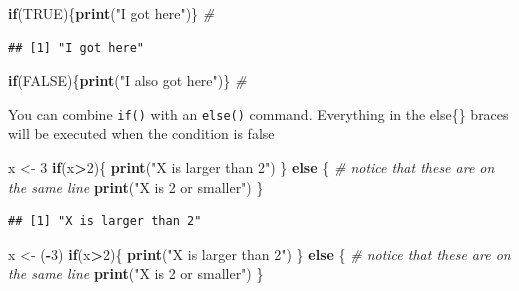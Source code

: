 \documentclass[]{article}
\newenvironment{Shaded}{\begin{snugshade}}{\end{snugshade}}
\newcommand{\KeywordTok}[1]{\textcolor[rgb]{0.13,0.29,0.53}{\textbf{#1}}}
\newcommand{\DecValTok}[1]{\textcolor[rgb]{0.00,0.00,0.81}{#1}}
\newcommand{\StringTok}[1]{\textcolor[rgb]{0.31,0.60,0.02}{#1}}
\newcommand{\CommentTok}[1]{\textcolor[rgb]{0.56,0.35,0.01}{\textit{#1}}}
\newcommand{\OtherTok}[1]{\textcolor[rgb]{0.56,0.35,0.01}{#1}}
\newcommand{\ControlFlowTok}[1]{\textcolor[rgb]{0.13,0.29,0.53}{\textbf{#1}}}
\newcommand{\OperatorTok}[1]{\textcolor[rgb]{0.81,0.36,0.00}{\textbf{#1}}}
\newcommand{\NormalTok}[1]{#1}
\begin{document}
\begin{Shaded}
\begin{Highlighting}[]
\ControlFlowTok{if}\NormalTok{(}\OtherTok{TRUE}\NormalTok{)\{}\KeywordTok{print}\NormalTok{(}\StringTok{"I got here"}\NormalTok{)\} }\CommentTok{#}
\end{Highlighting}
\end{Shaded}

\begin{verbatim}
## [1] "I got here"
\end{verbatim}

\begin{Shaded}
\begin{Highlighting}[]
\ControlFlowTok{if}\NormalTok{(}\OtherTok{FALSE}\NormalTok{)\{}\KeywordTok{print}\NormalTok{(}\StringTok{"I also got here"}\NormalTok{)\} }\CommentTok{#}
\end{Highlighting}
\end{Shaded}

You can combine \texttt{if()} with an \texttt{else()} command.
Everything in the else\{\} braces will be executed when the condition is
false

\begin{Shaded}
\begin{Highlighting}[]
\NormalTok{x <-}\StringTok{ }\DecValTok{3}
\ControlFlowTok{if}\NormalTok{(x}\OperatorTok{>}\DecValTok{2}\NormalTok{)\{}
  \KeywordTok{print}\NormalTok{(}\StringTok{"X is larger than 2"}\NormalTok{)}
\NormalTok{\} }\ControlFlowTok{else}\NormalTok{ \{ }\CommentTok{# notice that these are on the same line}
  \KeywordTok{print}\NormalTok{(}\StringTok{"X is 2 or smaller"}\NormalTok{)}
\NormalTok{\}}
\end{Highlighting}
\end{Shaded}

\begin{verbatim}
## [1] "X is larger than 2"
\end{verbatim}

\begin{Shaded}
\begin{Highlighting}[]
\NormalTok{x <-}\StringTok{ }\NormalTok{(}\OperatorTok{-}\DecValTok{3}\NormalTok{)}
\ControlFlowTok{if}\NormalTok{(x}\OperatorTok{>}\DecValTok{2}\NormalTok{)\{}
  \KeywordTok{print}\NormalTok{(}\StringTok{"X is larger than 2"}\NormalTok{)}
\NormalTok{\} }\ControlFlowTok{else}\NormalTok{ \{ }\CommentTok{# notice that these are on the same line}
  \KeywordTok{print}\NormalTok{(}\StringTok{"X is 2 or smaller"}\NormalTok{)}
\NormalTok{\}}
\end{Highlighting}
\end{Shaded}
\end{document}
